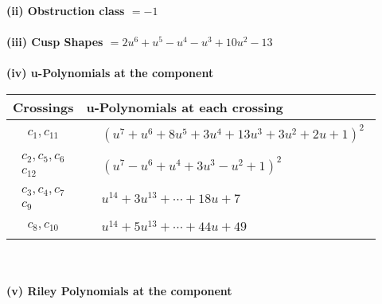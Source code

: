 \documentclass[1p]{elsarticle_modified}
\theoremstyle{definition}
\begin{document}
\flushleft \textbf{(ii) Obstruction class $= -1$}\\~\\
\flushleft \textbf{(iii) Cusp Shapes $= 2 u^6+u^5- u^4- u^3+10 u^2-13$}\\~\\
\newpage\renewcommand{\arraystretch}{1}
\flushleft \textbf{(iv) u-Polynomials at the component}\newline \\
\begin{tabular}{m{50pt}|m{274pt}}
Crossings & \hspace{64pt}u-Polynomials at each crossing \\
\hline $$\begin{aligned}c_{1},c_{11}\end{aligned}$$&$\begin{aligned}
&(u^7+u^6+8 u^5+3 u^4+13 u^3+3 u^2+2 u+1)^2
\end{aligned}$\\
\hline $$\begin{aligned}c_{2},c_{5},c_{6}\\c_{12}\end{aligned}$$&$\begin{aligned}
&(u^7- u^6+u^4+3 u^3- u^2+1)^2
\end{aligned}$\\
\hline $$\begin{aligned}c_{3},c_{4},c_{7}\\c_{9}\end{aligned}$$&$\begin{aligned}
&u^{14}+3 u^{13}+\cdots+18 u+7
\end{aligned}$\\
\hline $$\begin{aligned}c_{8},c_{10}\end{aligned}$$&$\begin{aligned}
&u^{14}+5 u^{13}+\cdots+44 u+49
\end{aligned}$\\
\hline
\end{tabular}\\~\\
\newpage\renewcommand{\arraystretch}{1}
\flushleft \textbf{(v) Riley Polynomials at the component}\newline \\
\end{document}
